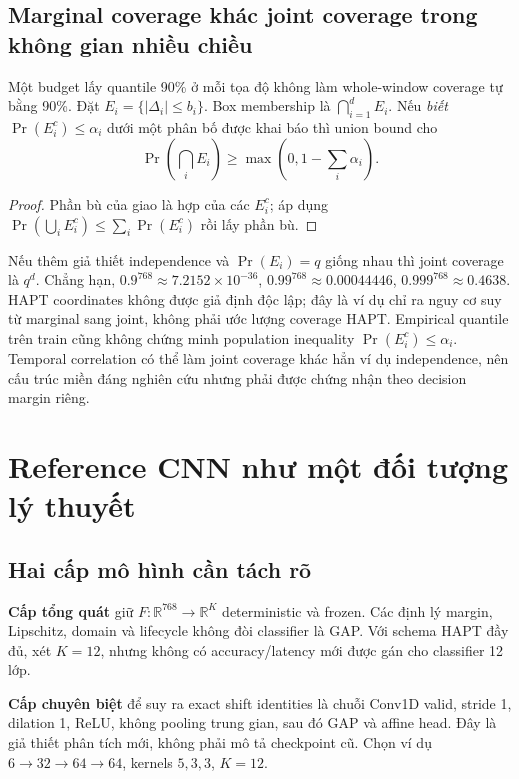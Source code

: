 \documentclass[11pt,a4paper]{article}
\newcommand{\R}{\mathbb R}
\theoremstyle{remark}
\begin{document}
\subsection{Marginal coverage khác joint coverage trong không gian nhiều chiều}
Một budget lấy quantile 90\% ở mỗi tọa độ không làm whole-window coverage
tự bằng 90\%. Đặt $E_i=\{|\Delta_i|\le b_i\}$. Box membership là
$\bigcap_{i=1}^dE_i$. Nếu \emph{biết} $\Pr(E_i^c)\le\alpha_i$ dưới một
phân bố được khai báo thì union bound cho
\begin{equation}
 \Pr\left(\bigcap_iE_i\right)\ge
 \max\left(0,1-\sum_i\alpha_i\right).
\end{equation}
\begin{proof}
Phần bù của giao là hợp của các $E_i^c$; áp dụng
$\Pr(\bigcup_iE_i^c)\le\sum_i\Pr(E_i^c)$ rồi lấy phần bù.
\end{proof}
Nếu thêm giả thiết independence và $\Pr(E_i)=q$ giống nhau thì joint
coverage là $q^d$. Chẳng hạn, $0.9^{768}\approx7.2152\times10^{-36}$,
$0.99^{768}\approx0.00044446$, $0.999^{768}\approx0.4638$.
HAPT coordinates không được giả định độc lập; đây là ví dụ chỉ ra nguy cơ
suy từ marginal sang joint, không phải ước lượng coverage HAPT. Empirical
quantile trên train cũng không chứng minh population inequality
$\Pr(E_i^c)\le\alpha_i$. Temporal correlation có thể làm joint coverage
khác hẳn ví dụ independence, nên cấu trúc miền đáng nghiên cứu nhưng phải
được chứng nhận theo decision margin riêng.

\section{Reference CNN như một đối tượng lý thuyết}
\subsection{Hai cấp mô hình cần tách rõ}
\textbf{Cấp tổng quát} giữ $F:\R^{768}\to\R^K$ deterministic và frozen.
Các định lý margin, Lipschitz, domain và lifecycle không đòi classifier là
GAP. Với schema HAPT đầy đủ, xét $K=12$, nhưng không có accuracy/latency mới
được gán cho classifier 12 lớp.

\textbf{Cấp chuyên biệt} để suy ra exact shift identities là chuỗi
Conv1D valid, stride 1, dilation 1, ReLU, không pooling trung gian, sau đó
GAP và affine head. Đây là giả thiết phân tích mới, không phải mô tả
checkpoint cũ. Chọn ví dụ $6\to32\to64\to64$, kernels $5,3,3$, $K=12$.
\end{document}
